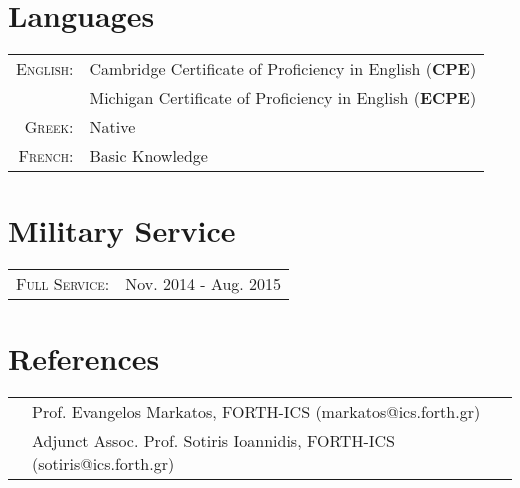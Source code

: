 \documentclass[a4paper,10pt]{article} %
\begin{document}

\section{Languages}

\begin{tabular}{rl}

\textsc{English:} & Cambridge Certificate of Proficiency in English (\textbf{CPE}) \\
& Michigan Certificate of Proficiency in English (\textbf{ECPE}) \\

\textsc{Greek:} & Native \\

\textsc{French:} & Basic Knowledge\\

\end{tabular}


\section{Military Service}

\begin{tabular}{rl}

\textsc{Full Service:} & Nov. 2014 - Aug. 2015

\end{tabular}


\section{References}

\begin{tabular}{rl}

& Prof. Evangelos Markatos, FORTH-ICS (markatos@ics.forth.gr) \\
& Adjunct Assoc. Prof. Sotiris Ioannidis, FORTH-ICS (sotiris@ics.forth.gr) \\

\end{tabular}
\end{document}
